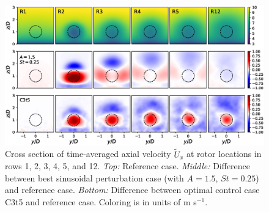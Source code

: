 \documentclass[wes, manuscript]{copernicus}
\begin{document}
\begin{figure}
	\centering
	\includegraphics[width=\textwidth]{frontviews_allc3t5.eps}
	\caption{Cross section of time-averaged axial velocity $\widetilde{U}_x$ at rotor locations in rows 1, 2, 3, 4, 5, and 12. \emph{Top: } Reference case. \emph{Middle: } Difference between best sinusoidal perturbation case (with $A = 1.5$, $St = 0.25$) and reference case. \emph{Bottom: } Difference between optimal control case C3t5 and reference case. Coloring is in units of m s$^{-1}$. \label{fig:cross_section_sinus}}
\end{figure}
\end{document}
